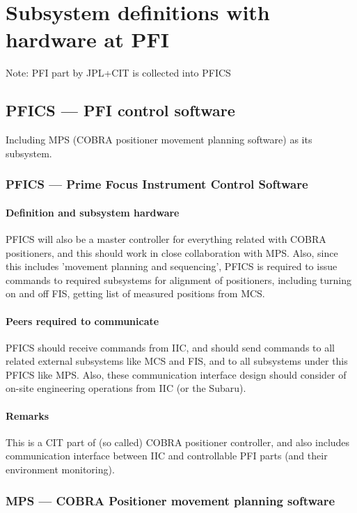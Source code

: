 \documentclass[a4paper,notitlepage]{article}
\begin{document}
\section{Subsystem definitions with hardware at PFI}

Note: PFI part by JPL+CIT is collected into PFICS

\subsection{PFICS --- PFI control software}

Including MPS (COBRA positioner movement planning software) as its 
subsystem.

\subsubsection{PFICS --- Prime Focus Instrument Control Software}
\paragraph{Definition and subsystem hardware}
PFICS will also be a master controller for everything related with COBRA 
positioners, and this should work in close collaboration with MPS. 
Also, since this includes 'movement planning and sequencing', PFICS is 
required to issue commands to required subsystems for alignment of 
positioners, including turning on and off FIS, getting list of measured 
positions from MCS. 
\paragraph{Peers required to communicate}
PFICS should receive commands from IIC, and should send commands to all related 
external subsystems like MCS and FIS, and to all subsystems under this PFICS 
like MPS. 
Also, these communication interface design should consider of on-site 
engineering operations from IIC (or the Subaru). 
\paragraph{Remarks}
This is a CIT part of (so called) COBRA positioner controller, and also 
includes communication interface between IIC and controllable PFI parts (and 
their environment monitoring). 

\subsubsection{MPS --- COBRA Positioner movement planning software}
\end{document}
